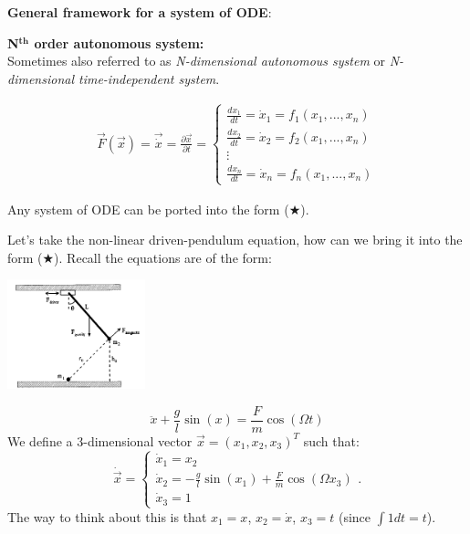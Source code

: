 \noindent
\textbf{General framework for a system of ODE}: 
\begin{definition}
    \textbf{N$^\textbf{th}$ order autonomous system:}\\
    Sometimes also referred to as \textit{N-dimensional autonomous system} or \textit{N-dimensional time-independent system}.

    \begin{align}
        \vec{F}(\vec{x}) = \vec{\dot{x}} =\frac{\partial \vec{x}}{\partial t} =
        \begin{cases}
            \frac{dx_1}{dt} = \dot{x}_1 = f_1(x_1,...,x_n) \\
            \frac{dx_2}{dt} = \dot{x}_2 = f_2(x_1,...,x_n) \\
            \vdots \\
            \frac{dx_n}{dt} = \dot{x}_n = f_n(x_1,...,x_n)
        \end{cases} 
        \tag{$\bigstar$}
    \end{align}
\end{definition}    
Any system of ODE can be ported into the form ($\bigstar$).\\

\begin{example}
    Let's take the non-linear driven-pendulum equation, how can we bring it into the form ($\bigstar$). Recall the equations are of the form: 
    \begin{center}
        \includegraphics[width=0.3\textwidth]{figures/2_pendulum.png}
    \end{center}
    \[ \ddot{x} + \frac{g}{l} \sin(x) = \frac{F}{m} \cos(\Omega t) \]
    We define a 3-dimensional vector $\vec{x} = (x_1,x_2,x_3)^T$ such that:
    \[ 
      \dot{\vec{x}} = 
        \begin{cases}
            \dot{x}_1 = x_2\\
            \dot{x}_2 = -\frac{g}{l} \sin(x_1) + \frac{F}{m} \cos(\Omega x_3)\\
            \dot{x}_3 = 1
        \end{cases}.
    \]
    The way to think about this is that $x_1 = x$, $x_2 =\dot{x}$, $x_3 = t$ (since $\int 1 dt = t$).
\end{example}

